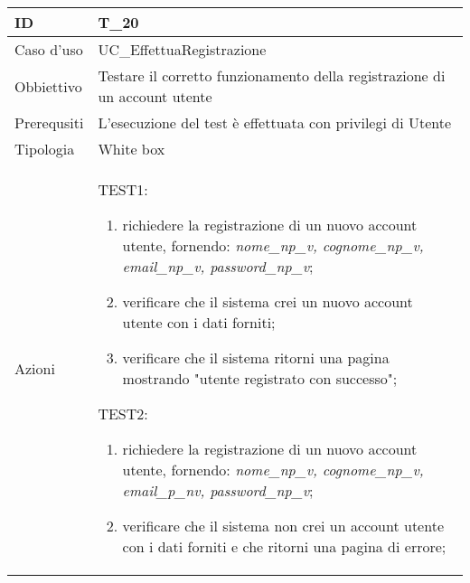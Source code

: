 \begin{table}[hb]
    \centering
    \begin{tabular}{ |p{2cm}|p{10cm}|  }
        \hline
        ID          & T\_20                                                                      \\\hline
        Caso d'uso  & UC\_EffettuaRegistrazione                                                  \\\hline
        Obbiettivo  & Testare il corretto funzionamento della registrazione di un account utente \\\hline
        Prerequsiti & L'esecuzione del test è effettuata con privilegi di Utente                 \\\hline
        Tipologia   & White box                                                                  \\\hline
        Azioni      &
        TEST1:
        \begin{enumerate}[nosep, topsep=0pt]
            \item richiedere la registrazione di un nuovo account utente, fornendo: \emph{nome\_np\_v, cognome\_np\_v, email\_np\_v, password\_np\_v};
            \item verificare che il sistema crei un nuovo account utente con i dati forniti;
            \item verificare che il sistema ritorni una pagina mostrando "utente registrato con successo";
        \end{enumerate}
        \vspace{0.5cm} TEST2:
        \begin{enumerate}[nosep, topsep=0pt]
            \item richiedere la registrazione di un nuovo account utente, fornendo: \emph{nome\_np\_v, cognome\_np\_v, email\_p\_nv, password\_np\_v};
            \item verificare che il sistema non crei un account utente con i dati forniti e che ritorni una pagina di errore;
        \end{enumerate}
        \\\hline
    \end{tabular}
\end{table}

